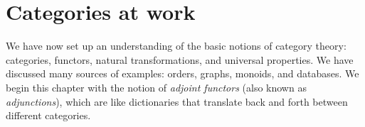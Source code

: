 
\chapter{Categories at work}

We have now set up an understanding of the basic notions of category theory: categories, functors, natural transformations, and universal properties. We have discussed many sources of examples: orders, graphs, monoids, and databases. We begin this chapter with the notion of {\em adjoint functors} (also known as {\em adjunctions}), which are like dictionaries that translate back and forth between different categories. 

